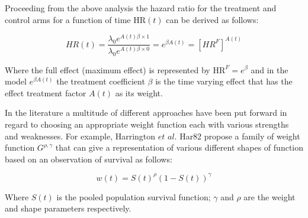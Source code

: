 \documentclass[12pt,twoside]{reedthesis}
\begin{document}
Proceeding from the above analysis the hazard ratio for the treatment and control arms for a function of time \(\mathrm{HR}(t)\) can be derived as follows:

\[H R(t)=\frac{\lambda_{0} e^{A(t) \beta \times 1}}{\lambda_{0} e^{A(t) \beta \times 0}}=e^{\beta A(t)}=\left[H R^{F}\right]^{A(t)}\]

Where the full effect (maximum effect) is represented by \(\mathrm{HR}^{F}=e^{\beta}\) and in the model \(e^{\beta A(t)}\) the treatment coefficient \(\beta\) is the time varying effect that has the effect treatment factor \(A(t)\) as its weight.

In the literature a multitude of different approaches have been put forward in regard to choosing an appropriate weight function each with various strengths and weaknesses. For example, Harrington \(\textit{et al.}\) Har82 propose a family of weight function \(G^{\rho, \gamma}\) that can give a representation of various different shapes of function based on an observation of survival as follows:

\[w(t)=S(t)^{\rho}(1-S(t))^{\gamma}\]

Where \(S(t)\) is the pooled population survival function; \(\gamma\) and \(\rho\) are the weight and shape parameters respectively.
\end{document}

